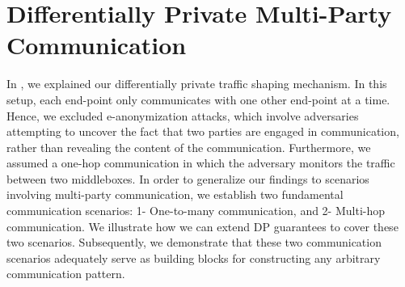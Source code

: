 \chapter{Differentially Private Multi-Party Communication}
In , we explained our differentially private traffic shaping mechanism. 
In this setup, each end-point only communicates with one other end-point at a time. 
Hence, we excluded e-anonymization attacks, which involve adversaries attempting to uncover the fact that two parties are engaged in communication, rather than revealing the content of the communication.
Furthermore, we assumed a one-hop communication in which the adversary monitors the traffic between two middleboxes.
In order to generalize our findings to scenarios involving multi-party communication, we establish two fundamental communication scenarios: 1- One-to-many communication, and 2- Multi-hop communication. 
We illustrate how we can extend DP guarantees to cover these two scenarios.
Subsequently, we demonstrate that these two communication scenarios adequately serve as building blocks for constructing any arbitrary communication pattern.


